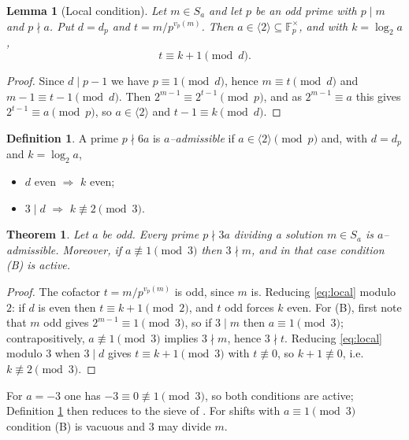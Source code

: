 \documentclass[11pt,reqno]{amsart}
\theoremstyle{plain}
\newtheorem{theorem}{Theorem}
\newtheorem{lemma}{Lemma}
\theoremstyle{definition}
\newtheorem{definition}{Definition}
\theoremstyle{remark}
\newcommand{\F}{\mathbb{F}}
\newcommand{\dvd}{\mid}
\newcommand{\Sa}{S_a}
\begin{document}
\begin{lemma}[Local condition]\label{lem:local}
Let $m\in\Sa$ and let $p$ be an odd prime with $p\dvd m$ and $p\nmid a$. Put $d=d_p$ and $t=m/p^{v_p(m)}$. Then $a\in\langle2\rangle\subseteq\F_p^{\times}$, and with $k=\log_2a$,
\begin{equation}\label{eq:local}
t\equiv k+1\pmod d.
\end{equation}
\end{lemma}

\begin{proof}
Since $d\dvd p-1$ we have $p\equiv1\pmod d$, hence $m\equiv t\pmod d$ and $m-1\equiv t-1\pmod d$. Then $2^{m-1}\equiv2^{t-1}\pmod p$, and as $2^{m-1}\equiv a$ this gives $2^{t-1}\equiv a\pmod p$, so $a\in\langle2\rangle$ and $t-1\equiv k\pmod d$.
\end{proof}

\begin{definition}\label{def:admissible}
A prime $p\nmid 6a$ is \emph{$a$--admissible} if $a\in\langle2\rangle\pmod p$ and, with $d=d_p$ and $k=\log_2a$,
\begin{itemize}
\item[(A)] $d$ even $\Rightarrow$ $k$ even;
\item[(B)] $3\dvd d$ $\Rightarrow$ $k\not\equiv2\pmod3$.
\end{itemize}
\end{definition}

\begin{theorem}\label{thm:admissible}
Let $a$ be odd. Every prime $p\nmid3a$ dividing a solution $m\in\Sa$ is $a$--admissible. Moreover, if $a\not\equiv1\pmod3$ then $3\nmid m$, and in that case condition \textnormal{(B)} is active.
\end{theorem}

\begin{proof}
The cofactor $t=m/p^{v_p(m)}$ is odd, since $m$ is. Reducing \eqref{eq:local} modulo $2$: if $d$ is even then $t\equiv k+1\pmod2$, and $t$ odd forces $k$ even. For (B), first note that $m$ odd gives $2^{m-1}\equiv1\pmod3$, so if $3\dvd m$ then $a\equiv1\pmod3$; contrapositively, $a\not\equiv1\pmod3$ implies $3\nmid m$, hence $3\nmid t$. Reducing \eqref{eq:local} modulo $3$ when $3\dvd d$ gives $t\equiv k+1\pmod3$ with $t\not\equiv0$, so $k+1\not\equiv0$, i.e.\ $k\not\equiv2\pmod3$.
\end{proof}

For $a=-3$ one has $-3\equiv0\not\equiv1\pmod3$, so both conditions are active; Definition \ref{def:admissible} then reduces to the sieve of \cite{prior}. For shifts with $a\equiv1\pmod3$ condition (B) is vacuous and $3$ may divide $m$.
\end{document}
